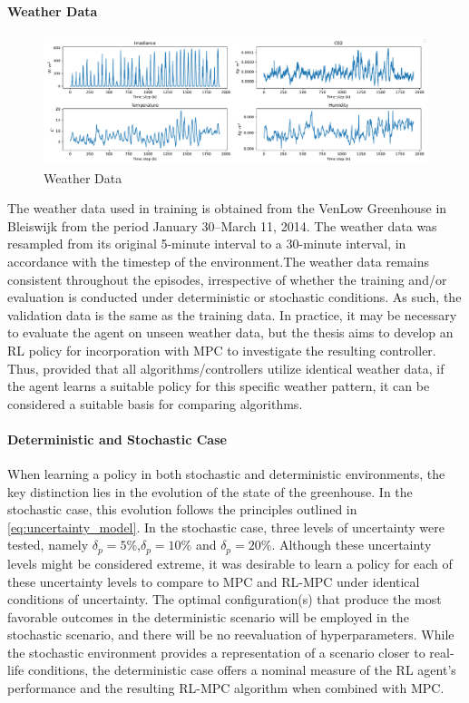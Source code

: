 \paragraph{Weather Data}

\begin{figure}[H]
    \centering
    \includegraphics[width=\textwidth]{figures/weather_data.pdf}
    \caption{Weather Data}
    \label{fig:weather-data}
\end{figure}

The weather data used in training is obtained from the VenLow Greenhouse in Bleiswijk from the period January 30–March 11, 2014. The weather data was resampled from its original 5-minute interval to a 30-minute interval, in accordance with the timestep of the environment.The weather data remains consistent throughout the episodes, irrespective of whether the training and/or evaluation is conducted under deterministic or stochastic conditions. As such, the validation data is the same as the training data. In practice, it may be necessary to evaluate the agent on unseen weather data, but the thesis aims to develop an RL policy for incorporation with MPC to investigate the resulting controller. Thus, provided that all algorithms/controllers utilize identical weather data, if the agent learns a suitable policy for this specific weather pattern, it can be considered a suitable basis for comparing algorithms.


\paragraph{Deterministic and Stochastic Case}
When learning a policy in both stochastic and deterministic environments, the key distinction lies in the evolution of the state of the greenhouse. In the stochastic case, this evolution follows the principles outlined in \autoref{eq:uncertainty_model}. In the stochastic case, three levels of uncertainty were tested, namely $\delta_p = 5\%$,$\delta_p = 10\%$ and $\delta_p = 20\%$. Although these uncertainty levels might be considered extreme, it was desirable to learn a policy for each of these uncertainty levels to compare to MPC and RL-MPC under identical conditions of uncertainty. The optimal configuration(s) that produce the most favorable outcomes in the deterministic scenario will be employed in the stochastic scenario, and there will be no reevaluation of hyperparameters. While the stochastic environment provides a representation of a scenario closer to real-life conditions, the deterministic case offers a nominal measure of the RL agent's performance and the resulting RL-MPC algorithm when combined with MPC.

